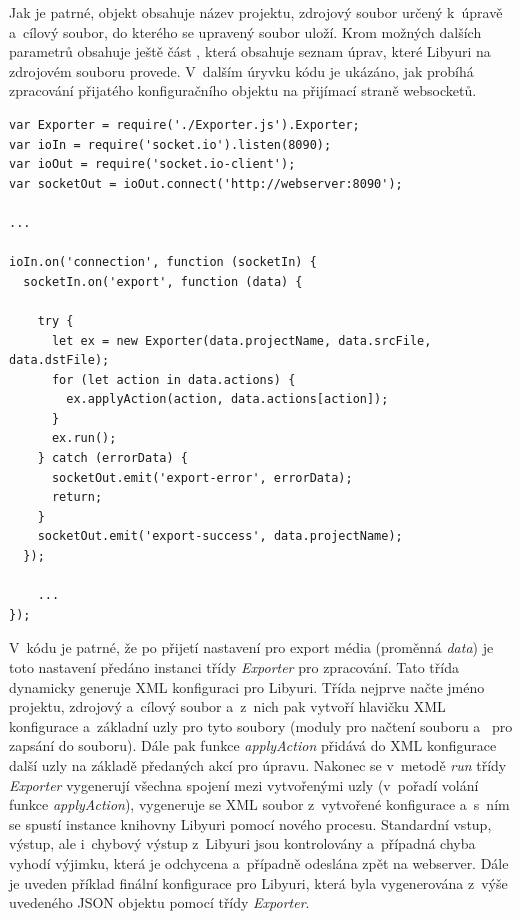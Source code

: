 \documentclass[thesis=M,czech]{FITthesis}[2012/06/26]
\begin{document}
Jak je patrné, objekt obsahuje název projektu, zdrojový soubor určený k~úpravě a~cílový soubor, do kterého se upravený soubor uloží. Krom možných dalších parametrů obsahuje ještě část , která obsahuje seznam úprav, které Libyuri na zdrojovém souboru provede. V~dalším úryvku kódu je ukázáno, jak probíhá zpracování přijatého konfiguračního objektu na přijímací straně websocketů.\\

\begin{lstlisting}[style=htmlcssjs]
var Exporter = require('./Exporter.js').Exporter;
var ioIn = require('socket.io').listen(8090);
var ioOut = require('socket.io-client');
var socketOut = ioOut.connect('http://webserver:8090');

...

ioIn.on('connection', function (socketIn) {
  socketIn.on('export', function (data) {

    try {
      let ex = new Exporter(data.projectName, data.srcFile, data.dstFile);
      for (let action in data.actions) {
        ex.applyAction(action, data.actions[action]);
      }
      ex.run();
    } catch (errorData) {
      socketOut.emit('export-error', errorData);
      return;
    }
    socketOut.emit('export-success', data.projectName);
  });
  
	...
});
\end{lstlisting}

V~kódu je patrné, že po přijetí nastavení pro export média (proměnná \textit{data}) je toto nastavení předáno instanci třídy \textit{Exporter} pro zpracování. Tato třída dynamicky generuje XML konfiguraci pro Libyuri. Třída nejprve načte jméno projektu, zdrojový a~cílový soubor a~z~nich pak vytvoří hlavičku XML konfigurace a~základní uzly pro tyto soubory (moduly  pro načtení souboru a~ pro zapsání do souboru). Dále pak funkce \textit{applyAction} přidává do XML konfigurace další uzly na základě předaných akcí pro úpravu. Nakonec se v~metodě \textit{run} třídy \textit{Exporter} vygenerují všechna spojení mezi vytvořenými uzly (v~pořadí volání funkce \textit{applyAction}), vygeneruje se XML soubor z~vytvořené konfigurace a~s~ním se spustí instance knihovny Libyuri pomocí nového procesu. Standardní vstup, výstup, ale i~chybový výstup z~Libyuri jsou kontrolovány a~případná chyba vyhodí výjimku, která je odchycena a~případně odeslána zpět na webserver. Dále je uveden příklad finální konfigurace pro Libyuri, která byla vygenerována z~výše uvedeného JSON objektu pomocí třídy \textit{Exporter}.\\
\end{document}
